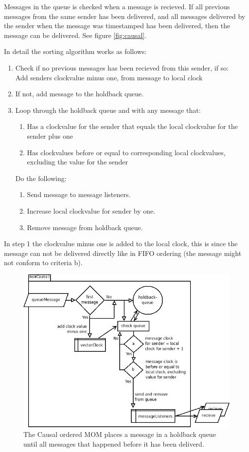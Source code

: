 \documentclass[english]{article}
\begin{document}
Messages in the queue is checked when a message is recieved. If all previous messages from the same sender has been delivered, and all messages delivered by the sender when the message was timestamped has been delivered, then the message can be delivered. See figure \vref{fig:causal}.

In detail the sorting algorithm works as follows:
\begin{enumerate}
\item Check if no previous messages has been recieved from this sender, if so:\\
	Add senders clockvalue minus one, from message to local clock
\item If not, add message to the holdback queue.
\item Loop through the holdback queue and with any message that:
	\begin{enumerate}
	\item Has a clockvalue for the sender that equals the local clockvalue for the sender plus one
	\item Has clockvalues before or equal to corresponding local clockvalues, excluding the value for the sender
	\end{enumerate}
	Do the following:
	\begin{enumerate}
	\item Send message to message listeners.
	\item Increase local clockvalue for sender by one.
	\item Remove message from holdback queue.
	\end{enumerate}
\end{enumerate}

In step 1 the clockvalue minus one is added to the local clock, this is since the message can not be delivered directly like in FIFO ordering (the message might not conform to criteria b). 

\begin{figure}
\includegraphics[width=\textwidth]{momCausal.png}
\caption{The Causal ordered MOM places a message in a holdback queue until all messages that happened before it has been deliverd.}
\label{fig:causal}
\end{figure}
\end{document}

